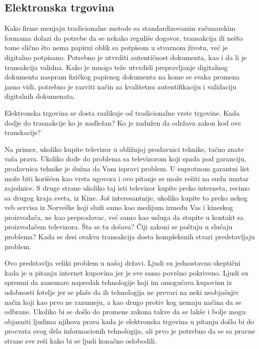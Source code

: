 \documentclass[a4paper]{article}
\begin{document}
{\subsection{Elektronska trgovina}

Kako firme menjaju tradicionalne metode sa standardizovanim ra\-ču\-na\-rskim formama dolazi do potrebe da se nekako reguliše dogovor, transakcija ili nešto tome slično što nema papirni oblik sa potpisom u stvarnom životu, već je digitalno potpisano. Potrebno je utvrditi autentičnost dokumenta, kao i da li je transakcija validna. Kako je mnogo teže utvrdidi prepravljanje digitalnog dokumenta naspram fizičkog papirnog dokumenta na kome se svaka promena jasno vidi, potrebno je razviti način za kvalitetnu autentifikaciju i validaciju digitalnih dokumenata.\cite{Legal_issues}

Elektronska trgovina se dosta razlikuje od tradicionalne vrste trgovine. Kada dodje do trasnakcije ko je nadležan? Ko je zadužen da održava zakon kod ove transkacije?

Na primer, ukoliko kupite televizor u obližnjoj prodavnici tehnike, tačno znate vaša prava. Ukoliko dođe do problema sa televizorom koji spada pod garanciju, prodavnica tehnike je dužna da Vam ispravi problem. U suprotnom garantni list može biti korišćen kao vrsta ugovora i ovo pitanje se može rešiti na sudu unutar zajednice. S druge strane ukoliko taj isti televizor kupite preko interneta, recimo sa drugog kraja sveta, iz Kine. Još interesantnije, ukoliko kupite to preko nekog veb servisa iz Norveške koji služi samo kao medijum između Vas i kineskog proizvođača, ne kao preprodavac, već samo kao usluga da stupite u kontakt sa proizvođačem televizora. Šta se tu dešava? Čiji zakoni se poštuju u slučaju problema? Kada se desi ovakva transakcija dosta kompleksnih stvari predstavljaju problem.

Ovo predstavlja veliki problem u našoj državi. Ljudi su jednostavno skeptični kada je u pitanju internet kupovina jer je sve samo površno pokriveno. Ljudi su spremni da zanemare napredak tehnologije koji im omogućava kupovinu iz udobnosti fotelje jer se plaše da ih tehnologija ne prevari na neki neobjašnjiv način koji kao prvo ne razumeju, a kao drugo protiv kog nemaju načina da se odbrane. Ukoliko bi se došlo do promene zakona takve da se lakše i bolje mogu objasniti ljudima njihova prava kada je elektronska trgovina u pitanju došlo bi do procvata ovog dela informacionih tehnologija, ali prvo je potrebno da se sa pravne strane sve reši kako bi se ljudi konačno oslobodili.

}
\end{document}
